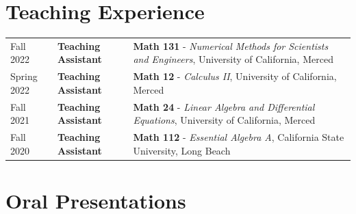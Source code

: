 \documentclass[11pt]{article}
\begin{document}
\section*{Teaching Experience}

\vskip 0.15in
\noindent
\begin{tabular}{llp{}}
  Fall 2022 & {\bf Teaching Assistant} & {\bf Math 131} - {\it Numerical
    Methods for Scientists and Engineers}, University of California,
  Merced\\
  Spring 2022 & {\bf Teaching Assistant} & {\bf Math 12} - {\it Calculus
    II}, University of California, Merced\\
  Fall 2021 & {\bf Teaching Assistant} & {\bf Math 24} - {\it Linear
    Algebra and Differential Equations}, University of California,
  Merced\\
  Fall 2020 & {\bf Teaching Assistant} & {\bf Math 112} - {\it Essential
    Algebra A}, California State University, Long Beach
\end{tabular}

\section*{Oral Presentations}
\end{document}
